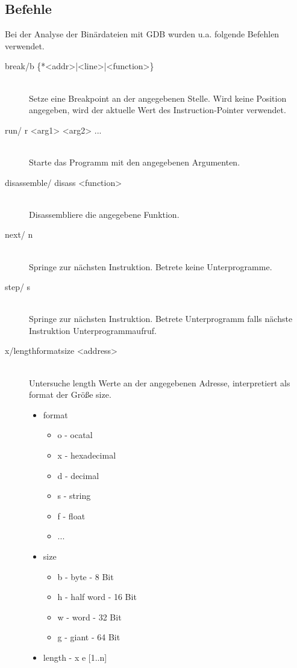 \documentclass[12pt]{article}
\begin{document}
\subsection{Befehle}
Bei der Analyse der Binärdateien mit GDB wurden u.a. folgende Befehlen verwendet.
\begin{description}
	\item [break/b \{*<addr>|<line>|<function>\}]\hfill \\
		Setze eine Breakpoint an der angegebenen Stelle. Wird keine Position angegeben, wird der aktuelle Wert des Instruction-Pointer verwendet.
	\item [run/ r <arg1> <arg2> ...]\hfill \\
		Starte das Programm mit den angegebenen Argumenten.
	\item [disassemble/ disass <function>]\hfill \\
		Disassembliere die angegebene Funktion.
	\item [ next/ n]\hfill \\
		Springe zur nächsten Instruktion. Betrete keine Unterprogramme.
	\item [ step/ s]\hfill \\
		Springe zur nächsten Instruktion. Betrete Unterprogramm falls nächste Instruktion Unterprogrammaufruf.
	\item [ x/{length}{format}{size} <address>]\hfill \\
		Untersuche length Werte an der angegebenen Adresse, interpretiert als format der Größe size.
		\begin{itemize}
		\item format
		\begin{itemize}
			\item o - ocatal
			\item x - hexadecimal
			\item d - decimal
			\item s - string
			\item f - float
			\item ...
		\end{itemize}
		\item size
		\begin{itemize}
			\item b - byte - 8 Bit
			\item h - half word - 16 Bit
			\item w - word - 32 Bit
			\item g - giant - 64 Bit
		\end{itemize}
		\item length - x e [1..n]

		\end{itemize}

\end{description}
\end{document}
